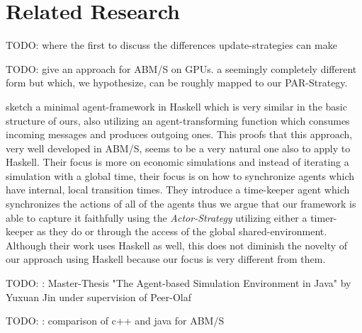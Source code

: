 \section{Related Research}
TODO: \cite{huberman_evolutionary_1993} where the first to discuss the differences update-strategies can make

TODO: \cite{a_framework_2008} give an approach for ABM/S on GPUs. a seemingly completely different form but which, we hypothesize, can be roughly mapped to our PAR-Strategy. 
	
\cite{botta_time_2010} sketch a minimal agent-framework in Haskell which is very similar in the basic structure of ours, also utilizing an agent-transforming function which consumes incoming messages and produces outgoing ones. This proofs that this approach, very well developed in ABM/S, seems to be a very natural one also to apply to Haskell. Their focus is more on economic simulations and instead of iterating a simulation with a global time, their focus is on how to synchronize agents which have internal, local transition times. They introduce a time-keeper agent which synchronizes the actions of all of the agents thus we argue that our framework is able to capture it faithfully using the \textit{Actor-Strategy} utilizing either a timer-keeper as they do or through the access of the global shared-environment. Although their work uses Haskell as well, this does not diminish the novelty of our approach using Haskell because our focus is very different from them.

TODO: \cite{yuxuan_agent-based_2016}: Master-Thesis "The Agent-based Simulation Environment in Java" by Yuxuan Jin under supervision of Peer-Olaf

TODO: \cite{dawson_opening_2014}: comparison of c++ and java for ABM/S